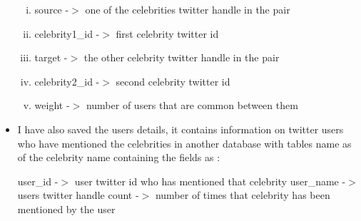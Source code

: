 \documentclass[runningheads,a4paper]{llncs}
\begin{document}
\begin{itemize}
\begin{enumerate}[i.  ]
\addtolength{\itemindent}{1cm}
\item source -$>$ one of the celebrities twitter handle in the pair
\item celebrity1\_id -$>$ first celebrity twitter id
\item target -$>$ the other celebrity twitter handle in the pair
\item celebrity2\_id -$>$ second celebrity twitter id
\item weight -$>$ number of users that are common between them
\end{enumerate}

\item	I have also saved the users details, it contains information on twitter users who have mentioned the celebrities in another database with tables name as of the celebrity name containing the fields as : 
  
\subitem user\_id -$>$ user twitter id who has mentioned that celebrity
\subitem user\_name -$>$ users twitter handle
\subitem count -$>$ number of times that celebrity has been mentioned by the user


\end{itemize}
\end{document}
